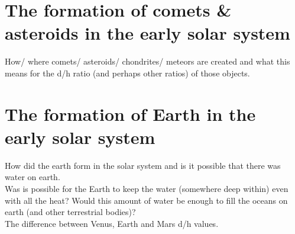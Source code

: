 \documentclass[11pt]{article}
\begin{document}



\newpage				%
\thispagestyle{empty}	%



\newpage				%
\renewcommand{\contentsname}{Table of Contents}
\tableofcontents		%
\thispagestyle{empty}	%


\newpage				%



\section{The formation of comets \& asteroids in the early solar system}
How/ where comets/ asteroids/ chondrites/ meteors are created and what this means for the d/h ratio (and perhaps other ratios) of those objects.\\


\section{The formation of Earth in the early solar system}
How did the earth form in the solar system and is it possible that there was water on earth.\\
Was is possible for the Earth to keep the water (somewhere deep within) even with all the heat?
Would this amount of water be enough to fill the oceans on earth (and other terrestrial bodies)?\\
The difference between Venus, Earth and Mars d/h values.\\
\end{document}

